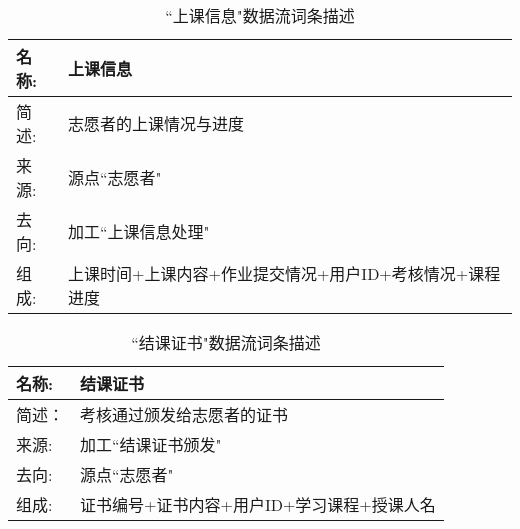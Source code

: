 \begin{table}[H]  
\caption{``上课信息"数据流词条描述}  
\begin{center}  
    \begin{tabular}{l p{11cm}} 
        \hline
        \quad 名称: & 上课信息 \\
        \hline
        \quad 简述: & 志愿者的上课情况与进度 \\
        \hline
        \quad 来源: & 源点``志愿者" \\
        \hline
        \quad 去向: & 加工``上课信息处理" \\
        \hline
        \quad 组成: & 上课时间+上课内容+作业提交情况+用户ID+考核情况+课程进度 \\
        \hline
    \end{tabular}
    \label{tab1}
\end{center}
\end{table}

\begin{table}[H]  
\caption{``结课证书"数据流词条描述}  
\begin{center}  
    \begin{tabular}{l p{11cm}} 
        \hline
        \quad 名称: & 结课证书 \\
        \hline
        \quad 简述：& 考核通过颁发给志愿者的证书 \\
        \hline
        \quad 来源: & 加工``结课证书颁发" \\
        \hline
        \quad 去向: & 源点``志愿者" \\
        \hline
        \quad 组成: & 证书编号+证书内容+用户ID+学习课程+授课人名\\
        \hline
    \end{tabular}
    \label{tab1}
\end{center}
\end{table}